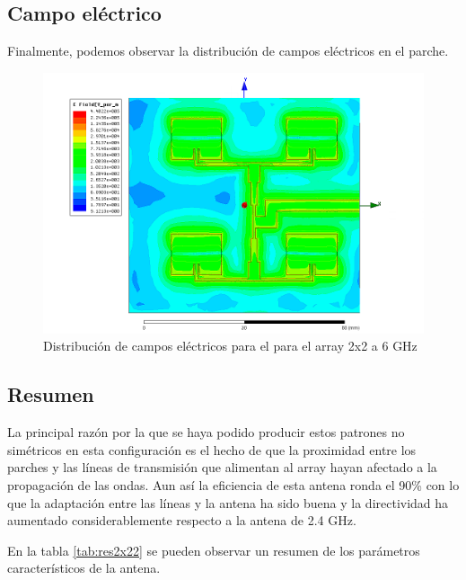 \subsection{Campo eléctrico}
\par Finalmente, podemos observar la distribución de campos eléctricos en el parche. 

\begin{figure}[H]
    \centering
        \includegraphics[width=\textwidth]{archivos/analisis/2x22/8}
        \caption{Distribución de campos eléctricos para el para el array 2x2 a 6 GHz}
        \label{fig:elec2x22}
\end{figure}

\subsection{Resumen}
\par La principal razón por la que se haya podido producir estos patrones no simétricos en esta configuración es el hecho de que la proximidad entre los parches y las líneas de transmisión que alimentan al array hayan afectado a la propagación de las ondas. Aun así la eficiencia de esta antena ronda el 90\%  con lo que la adaptación entre las líneas y la antena ha sido buena y la directividad ha aumentado considerablemente respecto a la antena de 2.4 GHz.
\\
\par En la tabla \ref{tab:res2x22} se pueden observar un resumen de los parámetros característicos de la antena.

